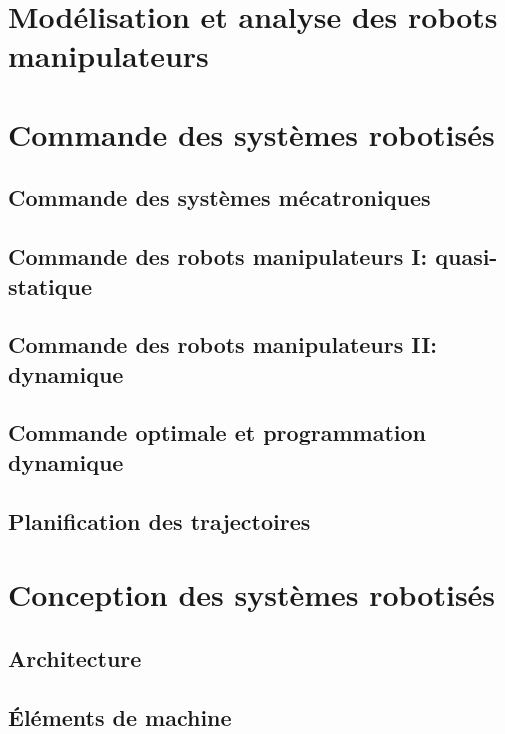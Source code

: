 \documentclass[letterpaper,oneside,french]{book}
\begin{document}


{\hypersetup{linkcolor=black}
\tableofcontents
\newpage
}


\part{Modélisation et analyse des robots manipulateurs}
\label{sec:manip}








\part{Commande des systèmes robotisés}
\label{sec:control}

\chapter{Commande des systèmes mécatroniques}
\chapter{Commande des robots manipulateurs I: quasi-statique}
\chapter{Commande des robots manipulateurs II: dynamique}
\chapter{Commande optimale et programmation dynamique}
\chapter{Planification des trajectoires}

\part{Conception des systèmes robotisés}
\label{sec:design}
\chapter{Architecture}
\chapter{Éléments de machine}
\end{document}
